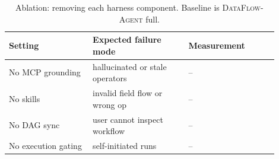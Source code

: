 \begin{table}[t]
\centering
\small
\begin{tabular}{p{0.28\linewidth}p{0.32\linewidth}p{0.30\linewidth}}
\toprule
Setting & Expected failure mode & Measurement \\
\midrule
No MCP grounding & hallucinated or stale operators & -- \\
No skills & invalid field flow or wrong op & -- \\
No DAG sync & user cannot inspect workflow & -- \\
No execution gating & self-initiated runs & -- \\
\bottomrule
\end{tabular}
\caption{Ablation: removing each harness component. Baseline is \textsc{DataFlow-Agent} full.}
\label{tab:ablation}
\end{table}
